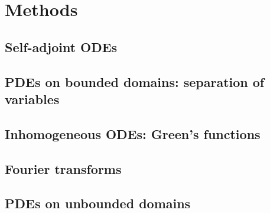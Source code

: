 \documentclass[main.tex]{subfiles}
\begin{document}
	\chapter{Methods}
	\section{Self-adjoint ODEs}
	
	\section{PDEs on bounded domains: separation of variables}
	
	\section{Inhomogeneous ODEs: Green's functions}
	
	\section{Fourier transforms}
	
	\section{PDEs on unbounded domains}
\end{document}
